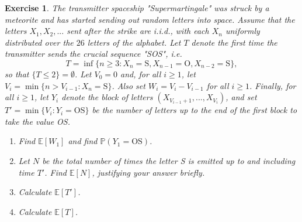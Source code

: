 \documentclass{article}
\newtheorem{exercise}[theorem]{Exercise}
\begin{document}
\begin{exercise}
The transmitter spaceship "Supermartingale" was struck by a meteorite and has started sending out random letters into space. Assume that the letters $X_1,X_2,...$ sent after the strike are i.i.d., with each $X_n$ uniformly distributed over the $26$ letters of the alphabet. Let $T$ denote the first time the transmitter sends the crucial sequence "SOS", i.e.\[T=\inf\{n\geq3:X_n=\text{S},X_{n-1}=\text{O},X_{n-2}=\text{S}\},\]so that $\{T\leq2\}=\emptyset$. Let $V_0=0$ and, for all $i\geq1$, let $V_i=\min\{n>V_{i-1}:X_n=\text{S}\}$. Also set $W_i=V_i-V_{i-1}$ for all $i\geq1$. Finally, for all $i\geq1$, let $Y_i$ denote the block of letters $(X_{V_{i-1}+1},...,X_{V_i})$, and set $T'=\min\{V_i:Y_i=\text{OS}\}$ be the number of letters up to the end of the first block to take the value OS.
\begin{enumerate}
\item[(a)] Find $\mathbb{E}[W_1]$ and find $\mathbb{P}(Y_1=\text{OS})$.
\item[(b)] Let $N$ be the total number of times the letter S is emitted up to and including time $T'$. Find $\mathbb{E}[N]$, justifying your answer briefly.
\item[(c)] Calculate $\mathbb{E}[T']$.
\item[(d)] Calculate $\mathbb{E}[T]$.
\end{enumerate}
\end{exercise}
\end{document}
